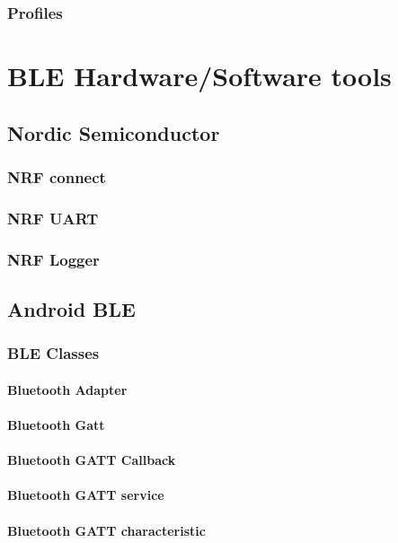 \subsubsection{Profiles}


\section{BLE Hardware/Software tools}

\subsection{Nordic Semiconductor}
\subsubsection{NRF connect}
\subsubsection{NRF UART}
\subsubsection{NRF Logger}

\subsection{Android BLE}
\subsubsection{BLE Classes}
\paragraph{Bluetooth Adapter}
\paragraph{Bluetooth Gatt}
\paragraph{Bluetooth GATT Callback}
\paragraph{Bluetooth GATT service}
\paragraph{Bluetooth GATT characteristic}


